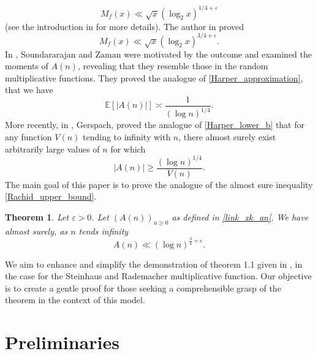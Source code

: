 \documentclass{article}
\newtheorem{theorem}{Theorem}[section]
\begin{document}
\begin{equation}\label{Harper_upper_b}
    M_f(x)\ll \sqrt{x} (\log_2 x)^{1/4+\varepsilon}
\end{equation}
(see the introduction in \cite{Harper3} for more details). The author in \cite{Rachid} proved 
\begin{equation}\label{Rachid_upper_bound}
    M_f(x)\ll \sqrt{x} (\log_2 x)^{3/4+\varepsilon}.
\end{equation}
In \cite{model_zaman}, Soundararajan and Zaman were motivated by the outcome and examined the moments of $A(n)$, revealing that they resemble those in the random multiplicative functions. They proved the analogue of \eqref{Harper_approximation}, that we have
$$
\mathbb{E}[|A(n)|] \asymp \frac{1}{(\log n)^{1/4}}.
$$
More recently, in \cite{model_maxim}, Gerspach, proved the analogue of \eqref{Harper_lower_b} that for any function $V(n)$ tending to infinity with $n$, there almost surely exist arbitrarily large values of $n$ for which
$$
|A(n)| \geqslant \frac{(\log n)^{1/4}}{V(n)}.
$$
The main goal of this paper is to prove the analogue of the almost sure inequality \eqref{Rachid_upper_bound}.
\begin{theorem}\label{theoreme_principal}
Let $\varepsilon >0$. Let $(A(n))_{n\geqslant 0}$ as defined in \eqref{link_xk_an}. We have almost surely,  as $n$ tends infinity
\begin{equation}
    A(n) \ll (\log n)^{\frac{3}{4}+ \varepsilon}.
\end{equation}
\end{theorem}
\noindent We aim to enhance and simplify the demonstration of theorem 1.1 given in \cite{Rachid}, in the case for the Steinhaus and Rademacher multiplicative function. Our objective is to create a gentle  proof for those seeking a comprehensible grasp of the theorem in the context of this model.
\section{Preliminaries}
\end{document}
